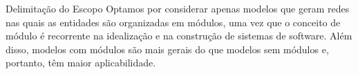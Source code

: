 \begin{section}{Delimitação do Escopo}
	Optamos por considerar apenas modelos que geram redes nas quais as entidades são organizadas em módulos, uma vez que o conceito de módulo é recorrente na idealização e na construção de sistemas de software. Além disso, modelos com módulos são mais gerais do que modelos sem módulos e, portanto, têm maior aplicabilidade.
	

\end{section}

